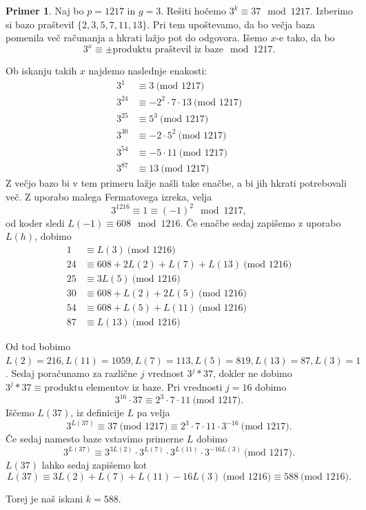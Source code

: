 \documentclass[12pt,a4paper,twoside]{article}
\theoremstyle{definition} %
\newtheorem{primer}[definicija]{Primer}
\theoremstyle{plain} %
\numberwithin{equation}{section}  %
\newcommand{\MOD}[1]{\ \text{(mod }{#1}\text{)}}
\begin{document}
\begin{primer}
Naj bo $p = 1217$ in $g= 3$. Rešiti hočemo $3^k \equiv 37 \mod 1217$. Izberimo si bazo praštevil $\{ 2,3,5,7,11,13 \}$. Pri tem upoštevamo, da bo večja baza pomenila več računanja a hkrati lažjo pot do odgovora. Išemo $x$-e  tako, da bo
$$3^x \equiv \pm \text{produktu praštevil iz baze} \mod 1217.$$

Ob iskanju takih $x$ najdemo naslednje enakosti:
\begin{align}
3^1 &\equiv 3 \MOD{1217} \nonumber \\ 
3^{24}  &\equiv -2^2\cdot 7\cdot 13 \MOD{1217} \nonumber \\
3^{25}  &\equiv 5^3 \MOD{1217} \nonumber \\
3^{30}  &\equiv -2 \cdot 5^2 \MOD{1217} \nonumber \\
3^{54}  &\equiv -5\cdot 11 \MOD{1217} \nonumber \\
3^{87}  &\equiv 13 \MOD{1217} \nonumber
\end{align}
Z večjo bazo bi v tem primeru lažje našli take enačbe, a bi jih hkrati potrebovali več.
Z uporabo malega Fermatovega izreka, velja
$$3^{1216} \equiv 1 \equiv (-1)^2 \mod 1217, $$
od koder sledi $L(-1) \equiv 608 \mod 1216$.
Če enačbe sedaj zapišemo z uporabo $L(h)$, dobimo
\begin{align}
1 &\equiv L(3) \MOD{1216} \nonumber \\ 
24&\equiv 608 + 2L(2) + L(7) +L(13) \MOD{1216} \nonumber \\
25 &\equiv 3L(5) \MOD{1216} \nonumber \\
30 &\equiv 608+L(2)+2L(5) \MOD{1216} \nonumber \\
54 &\equiv 608+L(5)+L(11) \MOD{1216} \nonumber \\
87  &\equiv L(13) \MOD{1216}  \nonumber
\end{align}

Od tod bobimo $L(2) = 216, L(11)=1059,L(7) = 113,L(5) = 819,L(13) = 87,L(3)=1$.
Sedaj poračunamo za različne $j$ vrednost $3^j*37$, dokler ne dobimo $3^j*37 \equiv \text{produktu elementov iz baze}$.
Pri vrednosti $j=16$ dobimo
$$3^{16}\cdot 37 \equiv 2^3\cdot 7 \cdot 11 \MOD{1217}.$$
Iščemo $L(37)$, iz definicije $L$ pa velja
$$3^{L(37)} \equiv 37 \MOD{1217} \equiv 2^3\cdot 7 \cdot 11 \cdot 3^{-16}\MOD{1217}.$$
Če sedaj namesto baze vstavimo primerne $L$ dobimo
$$3^{L(37)} \equiv 3^{3L(2)}\cdot 3^{L(7)} \cdot 3^{L(11)} \cdot 3^{-16L(3)}\MOD{1217}.$$
$L(37)$ lahko sedaj zapišemo kot
$$L(37) \equiv 3L(2) +L(7)+L(11) - 16L(3) \MOD{1216} \equiv 588 \MOD{1216}.$$

Torej je naš iskani $k=588$.

\end{primer}
\end{document}
